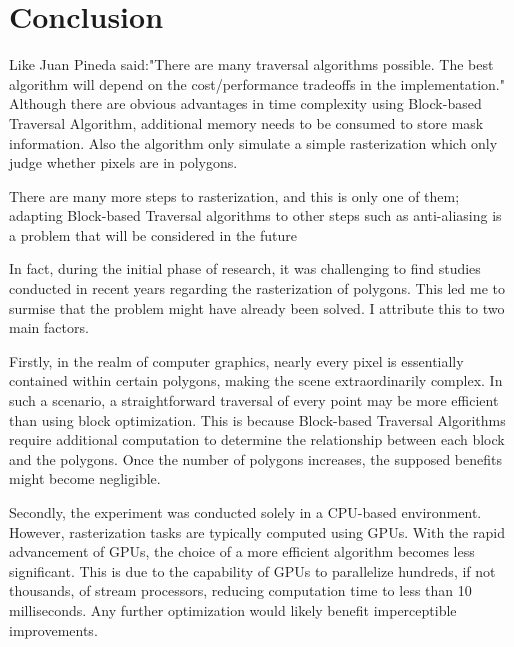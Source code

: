 \documentclass[
	a4paper, %
	10pt, %
	unnumberedsections, %
	twoside, %
]{LTJournalArticle}
\begin{document}

\section{Conclusion}

Like Juan Pineda said:"There are many traversal algorithms possible. The best algorithm will depend on the cost/performance tradeoffs in the implementation."\cite{pineda1988} Although there are obvious advantages in time complexity using Block-based Traversal Algorithm, additional memory needs to be consumed to store mask information. Also the algorithm only simulate a simple rasterization which only judge whether pixels are in polygons. 

There are many more steps to rasterization, and this is only one of them; adapting Block-based Traversal algorithms to other steps such as anti-aliasing is a problem that will be considered in the future

In fact, during the initial phase of research, it was challenging to find studies conducted in recent years regarding the rasterization of polygons. This led me to surmise that the problem might have already been solved. I attribute this to two main factors.

Firstly, in the realm of computer graphics, nearly every pixel is essentially contained within certain polygons, making the scene extraordinarily complex. In such a scenario, a straightforward traversal of every point may be more efficient than using block optimization. This is because Block-based Traversal Algorithms require additional computation to determine the relationship between each block and the polygons. Once the number of polygons increases, the supposed benefits might become negligible.

Secondly, the experiment was conducted solely in a CPU-based environment. However, rasterization tasks are typically computed using GPUs. With the rapid advancement of GPUs, the choice of a more efficient algorithm becomes less significant. This is due to the capability of GPUs to parallelize hundreds, if not thousands, of stream processors, reducing computation time to less than 10 milliseconds. Any further optimization would likely benefit imperceptible improvements.



\printbibliography

\end{document}
